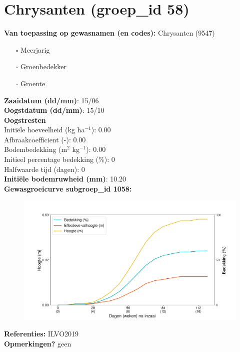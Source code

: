 \documentclass{article}
\begin{document}
 \section{Chrysanten (groep\_id 58)} 
 \textbf{Van toepassing op gewasnamen (en codes):} Chrysanten (9547) 
 \begin{multicols}{3} \begin{itemize} \item[$\square$] Meerjarig \item[$\square$] Groenbedekker \item[$\square$] Groente \end{itemize} \end{multicols} 
  \textbf{Zaaidatum (dd/mm)}: 15/06  \vspace{0.10cm} \\ 
  \textbf{Oogstdatum (dd/mm)}: 15/10  \vspace{0.10cm} \\ 
  \textbf{Oogstresten} \vspace{0.05cm} \\ 
  \tab Initi\"{e}le hoeveelheid (kg ha$^{-1}$): 0.00 \vspace{0.05cm} \\ 
  \tab Afbraakcoefficient (-): 0.00 \vspace{0.05cm} \\ 
  \tab Bodembedekking (m$^2$ kg$^{-1}$): 0.00 \vspace{0.05cm} \\ 
  \tab Initieel percentage bedekking (\%): 0 \vspace{0.05cm} \\ 
  \tab Halfwaarde tijd (dagen): 0 \vspace{0.05cm} \\ 
  \textbf{Initi\"{e}le bodemruwheid (mm)}: 10.20 \vspace{0.05cm} \\ 
  \textbf{Gewasgroeicurve subgroep\_id 1058:} 
 \begin{center} \begin{figure}[H] \includegraphics[width=12.5cm]{temp/1058.png} \end{figure} \end{center} 
  \textbf{Referenties:} ILVO2019 \vspace{0.10cm} \\ 
  \textbf{Opmerkingen?} geen \vspace{0.10cm} \\ 
 \newpage 
\end{document}
